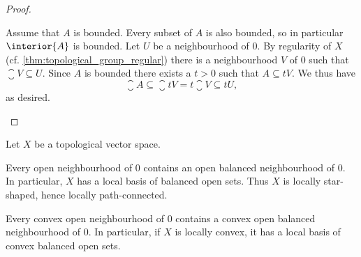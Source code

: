 \documentclass[article, a4paper, 11pt, oneside]{memoir}
\numberwithin{equation}{chapter}
\begin{document}
\begin{proof}
\begin{proofsec}
    \item[Proof of \subcref{enum:bounded-closure-interior}]
    Assume that $A$ is bounded. Every subset of $A$ is also bounded, so in particular $\interior{A}$ is bounded. Let $U$ be a neighbourhood of $0$. By regularity of $X$ (cf. \cref{thm:topological_group_regular}) there is a neighbourhood $V$ of $0$ such that $\closure{V} \subseteq U$. Since $A$ is bounded there exists a $t > 0$ such that $A \subseteq tV$. We thus have
    \begin{equation*}
        \closure{A}
            \subseteq \closure{tV}
            = t \closure{V}
            \subseteq tU,
    \end{equation*}
    as desired.
\end{proofsec}
\end{proof}


\begin{proposition}
    Let $X$ be a topological vector space.
    \begin{enumprop}
        \item \label{enum:balanced-local-basis} Every open neighbourhood of $0$ contains an open balanced neighbourhood of $0$. In particular, $X$ has a local basis of balanced open sets. Thus $X$ is locally star-shaped, hence locally path-connected.

        \item \label{enum:convex-balanced-local-basis} Every convex open neighbourhood of $0$ contains a convex open balanced neighbourhood of $0$. In particular, if $X$ is locally convex, it has a local basis of convex balanced open sets.
    \end{enumprop}
\end{proposition}
\end{document}

